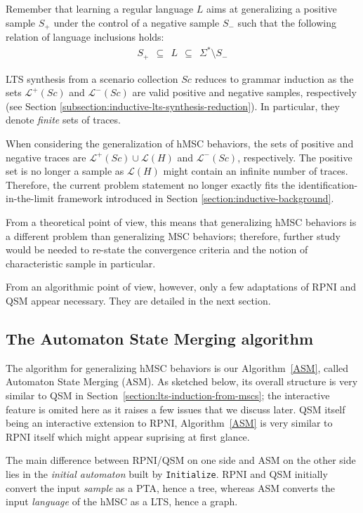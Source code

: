 Remember that learning a regular language $L$ aims at generalizing a positive sample $S_+$ under the control of a negative sample $S_-$ such that the following relation of language inclusions holds:
\begin{align}
S_+~~\subseteq~~L~~\subseteq~~\Sigma^*\setminus S_-
\end{align}

LTS synthesis from a scenario collection $Sc$ reduces to grammar induction as the sets $\mathcal{L}^+(Sc)$ and $\mathcal{L}^-(Sc)$ are valid positive and negative samples, respectively (see Section \ref{subsection:inductive-lts-synthesis-reduction}). In particular, they denote \emph{finite} sets of traces.

When considering the generalization of hMSC behaviors, the sets of positive and negative traces are $\mathcal{L}^+(Sc) \cup \mathcal{L}(H)$ and $\mathcal{L}^-(Sc)$, respectively. The positive set is no longer a sample as $\mathcal{L}(H)$ might contain an infinite number of traces. Therefore, the current problem statement no longer exactly fits the identification-in-the-limit framework introduced in Section \ref{section:inductive-background}. 

From a theoretical point of view, this means that generalizing hMSC behaviors is a different problem than generalizing MSC behaviors; therefore, further study would be needed to re-state the convergence criteria and the notion of characteristic sample in particular. 

From an algorithmic point of view, however, only a few adaptations of RPNI and QSM appear necessary. They are detailed in the next section.

\subsection{The Automaton State Merging algorithm\label{subsection:automaton-state-merging}}

The algorithm for generalizing hMSC behaviors is our Algorithm~\ref{ASM}, called Automaton State Merging (ASM). As sketched below, its overall structure is very similar to QSM in Section~\ref{section:lts-induction-from-mscs}; the interactive feature is omited here as it raises a few issues that we discuss later. QSM itself being an interactive extension to RPNI, Algorithm~\ref{ASM} is very similar to RPNI itself which might appear suprising at first glance.

The main difference between RPNI/QSM on one side and ASM on the other side lies in the \emph{initial automaton} built by \texttt{Initialize}. RPNI and QSM initially convert the input \emph{sample} as a PTA, hence a tree, whereas ASM converts the input \emph{language} of the hMSC as a LTS, hence a graph. 

